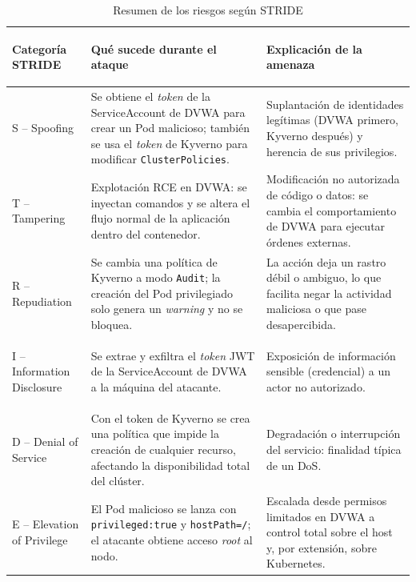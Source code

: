 \documentclass[12pt,twoside,titlepage]{report}
\begin{document}
\begin{table}[H]
\small
\centering
\begin{tabularx}{\textwidth}{>{\bfseries\raggedright\arraybackslash}p{2.8cm} Y Y}
\toprule
Categoría STRIDE & Qué sucede durante el ataque & Explicación de la amenaza \\
\midrule
S – Spoofing &
Se obtiene el \textit{token} de la ServiceAccount de DVWA para crear un Pod malicioso; también se usa el \textit{token} de Kyverno para modificar \texttt{ClusterPolicies}. &
Suplantación de identidades legítimas (DVWA primero, Kyverno después) y herencia de sus privilegios. \\[4pt]
\midrule
T – Tampering &
Explotación RCE en DVWA: se inyectan comandos y se altera el flujo normal de la aplicación dentro del contenedor. &
Modificación no autorizada de código o datos: se cambia el comportamiento de DVWA para ejecutar órdenes externas. \\[4pt]
\midrule
R – Repudiation &
Se cambia una política de Kyverno a modo \texttt{Audit}; la creación del Pod privilegiado solo genera un \textit{warning} y no se bloquea. &
La acción deja un rastro débil o ambiguo, lo que facilita negar la actividad maliciosa o que pase desapercibida. \\[4pt]
\midrule
I – Information Disclosure &
Se extrae y exfiltra el \textit{token} JWT de la ServiceAccount de DVWA a la máquina del atacante. &
Exposición de información sensible (credencial) a un actor no autorizado. \\[4pt]
\midrule
D – Denial of Service &
Con el token de Kyverno se crea una política que impide la creación de cualquier recurso, afectando la disponibilidad total del clúster. &
Degradación o interrupción del servicio: finalidad típica de un DoS. \\[4pt]
\midrule
E – Elevation of Privilege &
El Pod malicioso se lanza con \texttt{privileged:true} y \texttt{hostPath=/}; el atacante obtiene acceso \textit{root} al nodo. &
Escalada desde permisos limitados en DVWA a control total sobre el host y, por extensión, sobre Kubernetes. \\
\bottomrule
\end{tabularx}
\caption{Resumen de los riesgos según STRIDE}
\label{tab:resultados_stride}
\end{table}
\end{document}
